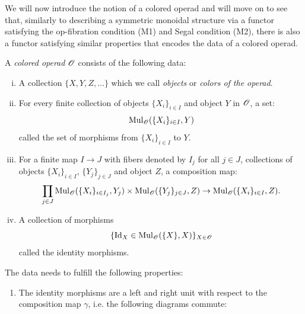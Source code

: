 We will now introduce the notion of a colored operad and will move on to see
that, similarly to describing a symmetric monoidal structure via a functor
satisfying the op-fibration condition (M1) and Segal condition (M2), there is
also a functor satisfying similar properties that encodes the data of a colored
operad.

\begin{defin}\label{coloroperad} A {\em colored operad} $\mathscr{O}$ consists of the
    following data:
    \begin{enumerate}[(i)]
        \item A collection $\{X,Y,Z, \dots\}$ which we call \emph{objects} or
        \emph{colors of the operad}.
        \item For every finite collection of objects $\{X_i\}_{i \in I}$ and
        object $Y$ in $\mathscr{O}$, a set:
        $$\operatorname{Mul}_{\mathscr{O}}(\{X_i\}_{i \in I}, Y)$$ called the set of morphisms from
        $\{X_i\}_{i \in I}$ to $Y$.
        \item For a finite map $I \to J$ with fibers denoted by $I_j$ for all $j
        \in J$, collections of objects $\{X_i\}_{i \in I}$, $\{Y_j\}_{j \in J}$
        and object $Z$, a composition map:
        \[
            \prod_{j \in J} \operatorname{Mul}_{\mathscr{O}}(\{X_i\}_{i \in I_j}, Y_j) \times \operatorname{Mul}_{\mathscr{O}}(\{Y_j\}_{j\in J}, Z) \to \operatorname{Mul}_{\mathscr{O}}(\{X_i\}_{i \in I}, Z).  
        \]
        \item A collection of morphisms 
        $$\{ \operatorname{Id}_X \in \operatorname{Mul}_{\mathscr{O}}(\{X\},X)\}_{X \in \mathscr{O}}$$ called the identity
        morphisms.
        \end{enumerate}

        The data needs to fulfill the following properties:
        \begin{enumerate}
            \item The identity morphisms are a left and right unit with respect
            to the composition map $\gamma$, i.e. the following diagrams
            commute:
            \begin{center}
            \end{center}
       

\end{enumerate}
\end{defin}
